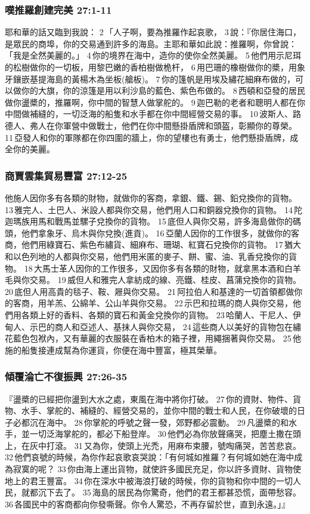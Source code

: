 \subsubsection{嘆推羅創建完美 27:1-11}
耶和華的話又臨到我說： 2 「人子啊，要為推羅作起哀歌， 3 說：『你居住海口，是眾民的商埠，你的交易通到許多的海島。主耶和華如此說：推羅啊，你曾說：「我是全然美麗的。」 4 你的境界在海中，造你的使你全然美麗。 5 他們用示尼珥的松樹做你的一切板，用黎巴嫩的香柏樹做桅杆， 6 用巴珊的橡樹做你的槳，用象牙鑲嵌基提海島的黃楊木為坐板(艙板)。 7 你的篷帆是用埃及繡花細麻布做的，可以做你的大旗，你的涼篷是用以利沙島的藍色、紫色布做的。 8 西頓和亞發的居民做你盪槳的，推羅啊，你中間的智慧人做掌舵的。 9 迦巴勒的老者和聰明人都在你中間做補縫的，一切泛海的船隻和水手都在你中間經營交易的事。 10 波斯人、路德人、弗人在你軍營中做戰士，他們在你中間懸掛盾牌和頭盔，彰顯你的尊榮。 11 亞發人和你的軍隊都在你四圍的牆上，你的望樓也有勇士，他們懸掛盾牌，成全你的美麗。

\subsubsection{商賈雲集貿易豐富 27:12-25}
他施人因你多有各類的財物，就做你的客商，拿銀、鐵、錫、鉛兌換你的貨物。 13 雅完人、土巴人、米設人都與你交易，他們用人口和銅器兌換你的貨物。 14 陀迦瑪族用馬和戰馬並騾子兌換你的貨物。 15 底但人與你交易，許多海島做你的碼頭，他們拿象牙、烏木與你兌換(進貢)。 16 亞蘭人因你的工作很多，就做你的客商，他們用綠寶石、紫色布繡貨、細麻布、珊瑚、紅寶石兌換你的貨物。 17 猶大和以色列地的人都與你交易，他們用米匿的麥子、餅、蜜、油、乳香兌換你的貨物。 18 大馬士革人因你的工作很多，又因你多有各類的財物，就拿黑本酒和白羊毛與你交易。 19 威但人和雅完人拿紡成的線、亮鐵、桂皮、菖蒲兌換你的貨物。 20 底但人用高貴的毯子、鞍、屜與你交易。 21 阿拉伯人和基達的一切首領都做你的客商，用羊羔、公綿羊、公山羊與你交易。 22 示巴和拉瑪的商人與你交易，他們用各類上好的香料、各類的寶石和黃金兌換你的貨物。 23 哈蘭人、干尼人、伊甸人、示巴的商人和亞述人、基抹人與你交易， 24 這些商人以美好的貨物包在繡花藍色包袱內，又有華麗的衣服裝在香柏木的箱子裡，用繩捆著與你交易。 25 他施的船隻接連成幫為你運貨，你便在海中豐富，極其榮華。

\subsubsection{傾覆淪亡不復振興 27:26-35}
『盪槳的已經把你盪到大水之處，東風在海中將你打破。 27 你的資財、物件、貨物、水手、掌舵的、補縫的、經營交易的，並你中間的戰士和人民，在你破壞的日子必都沉在海中。 28 你掌舵的呼號之聲一發，郊野都必震動。 29 凡盪槳的和水手，並一切泛海掌舵的，都必下船登岸。 30 他們必為你放聲痛哭，把塵土撒在頭上，在灰中打滾。 31 又為你，使頭上光禿，用麻布束腰，號啕痛哭，苦苦悲哀。 32 他們哀號的時候，為你作起哀歌哀哭說：「有何城如推羅？有何城如她在海中成為寂寞的呢？ 33 你由海上運出貨物，就使許多國民充足，你以許多資財、貨物使地上的君王豐富。 34 你在深水中被海浪打破的時候，你的貨物和你中間的一切人民，就都沉下去了。 35 海島的居民為你驚奇，他們的君王都甚恐慌，面帶愁容。 36 各國民中的客商都向你發嘶聲。你令人驚恐，不再存留於世，直到永遠。」』



